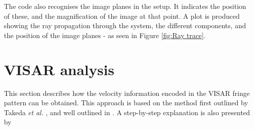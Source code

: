 The code also recognises the image planes in the setup. It indicates the position of these, and the magnification of the image at that point. A plot is produced showing the ray propagation through the system, the different components, and the position of the image planes - as seen in Figure \ref{fig:Ray trace}.

\section{VISAR analysis}
\label{appdx: VISAR analysis}
This section describes how the velocity information encoded in the VISAR fringe pattern can be obtained. This approach is based on the method first outlined by Takeda \textit{et al.} \cite{Takeda1982}, and well outlined in \cite{Celliers2004}. A step-by-step explanation is also presented by \cite{Hammel2017}

